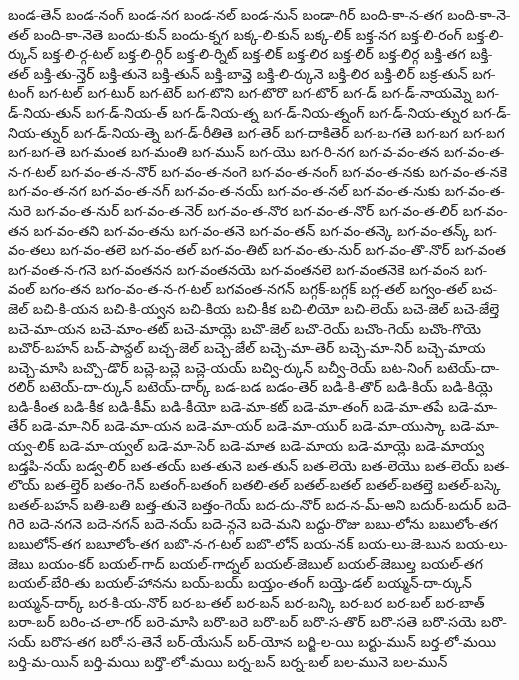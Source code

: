{బండ-తెన్
బండ-నంగ్
బండ-నగ
బండ-నల్
బండ-నున్
బండా-గిర్
బంది-కా-న-తగ
బంది-కా-నె-తల్
బంది-కా-నెతె
బందు-కున్
బందు-క్నగ
బక్క-లి-కున్
బక్క-లిక్
బక్త-నగ
బక్త-లి-రంగ్
బక్త-లి-ర్కున్
బక్త-లి-ర్గ-టల్
బక్త-లి-ర్గిర్
బక్త-లి-ర్నిట్
బక్త-లిక్
బక్త-లిర
బక్త-లిర్
బక్త-లిర్గ
బక్తి-తగ
బక్తి-తల్
బక్తి-తు-న్తెర్
బక్తి-తునె
బక్తి-తున్
బక్తి-బావ్తె
బక్తి-లి-ర్కునె
బక్తి-లిర
బక్తి-లిర్
బక్ర-తున్
బగ-టంగ్
బగ-టల్
బగ-టుర్
బగ-టెర్
బగ-టొని
బగ-టొరొ
బగ-టొర్
బగ-డ్
బగ-డ్-నాయమ్నె
బగ-డ్-నియ-తున్
బగ-డ్-నియ-త్
బగ-డ్-నియ-త్న
బగ-డ్-నియ-త్నంగ్
బగ-డ్-నియ-త్నుర
బగ-డ్-నియ-త్నుర్
బగ-డ్-నియ-త్నె
బగ-డ్-రీతితె
బగ-తెర్
బగ-దాకితెర్
బగ-బ-గతె
బగ-బగ
బగ-బగ
బగ-బగ-తె
బగ-మంత
బగ-మంతి
బగ-మున్
బగ-యొ
బగ-రి-నగ
బగ-వ-వం-తన
బగ-వం-త-న-గ-టల్
బగ-వం-త-న-నొర్
బగ-వం-త-నంగె
బగ-వం-త-నంగ్
బగ-వం-త-నకు
బగ-వం-త-నకె
బగ-వం-త-నగ
బగ-వం-త-నగ్
బగ-వం-త-నయ్
బగ-వం-త-నల్
బగ-వం-త-నుకు
బగ-వం-త-నురె
బగ-వం-త-నుర్
బగ-వం-త-నెర్
బగ-వం-త-నొర
బగ-వం-త-నొర్
బగ-వం-త-లిర్
బగ-వం-తన
బగ-వం-తని
బగ-వం-తను
బగ-వం-తనె
బగ-వం-తన్
బగ-వం-తన్కె
బగ-వం-తన్క్
బగ-వం-తలు
బగ-వం-తలె
బగ-వం-తల్
బగ-వం-తిట్
బగ-వం-తు-నుర్
బగ-వం-తొ-నొర్
బగ-వంత
బగ-వంత-న-గనె
బగ-వంతనన
బగ-వంతనయె
బగ-వంతనలె
బగ-వంతనెకె
బగ-వంన
బగ-వంల్
బగం-తన
బగం-వం-త-న-గ-టల్
బగవంత-నగన్
బగ్గక్-బగ్గక్
బగ్ల-తల్
బగ్వం-తల్
బచ-జెల్
బచి-కి-యన
బచి-కి-య్వన
బచి-కియ
బచి-కీక
బచి-లియో
బచి-లెయ్
బచె-జెల్
బచె-జేల్తె
బచె-మా-యన
బచె-మాం-తట్
బచె-మాయ్లె
బచొ-జెల్
బచొ-రెయ్
బచొం-గెయ్
బచొం-గొయె
బచొర్-బహన్
బచ్-పాన్దల్
బచ్చ-జెల్
బచ్చె-జేల్
బచ్చె-మా-తెర్
బచ్చె-మా-నిర్
బచ్చె-మాయ
బచ్చె-మాసి
బచ్చొ-డొర్
బచ్లె-బచ్లె
బచ్లె-యయ్
బచ్వి-ర్కున్
బచ్వీ-రెయ్
బట-నింగ్
బటెయ్-దా-రలిర్
బటెయ్-దా-ర్కున్
బటెయ్-దార్క్
బడ-బడ
బడం-తెర్
బడి-కి-తొర్
బడి-కియ్
బడి-కియ్లె
బడి-కీంత
బడి-కీక
బడి-కీమ్
బడి-కీయో
బడె-మా-కట్
బడె-మా-తంగ్
బడె-మా-తపే
బడె-మా-తేర్
బడె-మా-నిర్
బడె-మా-యన
బడె-మా-యర్
బడె-మా-యుర్
బడె-మా-యుస్కా
బడె-మా-య్వ-లిక్
బడె-మా-య్వల్
బడె-మా-సెర్
బడె-మాత
బడె-మాయ
బడె-మాయ్లె
బడె-మాయ్వ
బడ్తపి-నయ్
బడ్వ-లిర్
బత-తయ్
బత-తునె
బత-తున్
బత-లెయె
బత-లెయొ
బత-లెయ్
బత-లొయ్
బత-ల్తెర్
బతం-గెన్
బతంగ్-బతంగ్
బతలి-తల్
బతల్-బతల్
బతల్-బతల్తె
బతల్-బస్కె
బతల్-బహన్
బతి-బతి
బత్త-తునె
బత్తం-గెయ్
బద-దు-నొర్
బద-న-మ్-అని
బదుర్-బదుర్
బదె-గిరె
బదె-నగనె
బదె-నగన్
బదె-నయ్
బదె-న్గనె
బదె-మని
బద్దు-రొజు
బబు-లోను
బబులోం-తగ
బబులోన్-తగ
బబూలోం-తగ
బబొ-న-గ-టల్
బబొ-లోన్
బయ-నక్
బయ-లు-జె-బున
బయ-లు-జెబు
బయం-కర్
బయల్-గాద్
బయల్-గాద్నల్
బయల్-జెబుల్
బయల్-జెబుల్త
బయల్-తగ
బయల్-బేరి-తు
బయల్-హానను
బయ్-బయ్
బయ్తం-తంగ్
బయ్తె-డల్
బయ్మన్-దా-ర్కున్
బయ్మన్-దార్క్
బర-కి-య-నొర్
బర-బ-తల్
బర-బన్
బర-బన్కి
బర-బర
బర-బల్
బర-బాత్
బరా-బర్
బరిం-చ-లా-గర్
బరె-మాసి
బరొ-బరె
బరొ-బర్
బరొ-స-తొర్
బరొ-సతె
బరొ-సయె
బరొ-సయ్
బరొస-తగ
బరో-స-తెనే
బర్-యేసున్
బర్-యోన
బర్జి-ల-యి
బర్టు-మున్
బర్త-లో-మయి
బర్తి-మ-యిన్
బర్తి-మయి
బర్తొ-లో-మయి
బర్న-బన్
బర్న-బల్
బల-మునె
బల-మున్
}
